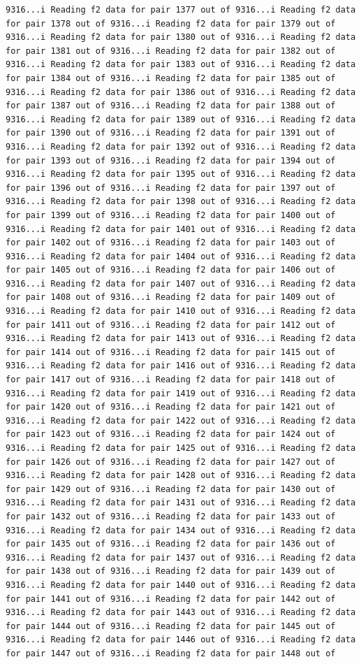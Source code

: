 \documentclass[
]{article}
\begin{document}
\begin{verbatim}
9316...i Reading f2 data for pair 1377 out of 9316...i Reading f2 data for pair 1378 out of 9316...i Reading f2 data for pair 1379 out of 9316...i Reading f2 data for pair 1380 out of 9316...i Reading f2 data for pair 1381 out of 9316...i Reading f2 data for pair 1382 out of 9316...i Reading f2 data for pair 1383 out of 9316...i Reading f2 data for pair 1384 out of 9316...i Reading f2 data for pair 1385 out of 9316...i Reading f2 data for pair 1386 out of 9316...i Reading f2 data for pair 1387 out of 9316...i Reading f2 data for pair 1388 out of 9316...i Reading f2 data for pair 1389 out of 9316...i Reading f2 data for pair 1390 out of 9316...i Reading f2 data for pair 1391 out of 9316...i Reading f2 data for pair 1392 out of 9316...i Reading f2 data for pair 1393 out of 9316...i Reading f2 data for pair 1394 out of 9316...i Reading f2 data for pair 1395 out of 9316...i Reading f2 data for pair 1396 out of 9316...i Reading f2 data for pair 1397 out of 9316...i Reading f2 data for pair 1398 out of 9316...i Reading f2 data for pair 1399 out of 9316...i Reading f2 data for pair 1400 out of 9316...i Reading f2 data for pair 1401 out of 9316...i Reading f2 data for pair 1402 out of 9316...i Reading f2 data for pair 1403 out of 9316...i Reading f2 data for pair 1404 out of 9316...i Reading f2 data for pair 1405 out of 9316...i Reading f2 data for pair 1406 out of 9316...i Reading f2 data for pair 1407 out of 9316...i Reading f2 data for pair 1408 out of 9316...i Reading f2 data for pair 1409 out of 9316...i Reading f2 data for pair 1410 out of 9316...i Reading f2 data for pair 1411 out of 9316...i Reading f2 data for pair 1412 out of 9316...i Reading f2 data for pair 1413 out of 9316...i Reading f2 data for pair 1414 out of 9316...i Reading f2 data for pair 1415 out of 9316...i Reading f2 data for pair 1416 out of 9316...i Reading f2 data for pair 1417 out of 9316...i Reading f2 data for pair 1418 out of 9316...i Reading f2 data for pair 1419 out of 9316...i Reading f2 data for pair 1420 out of 9316...i Reading f2 data for pair 1421 out of 9316...i Reading f2 data for pair 1422 out of 9316...i Reading f2 data for pair 1423 out of 9316...i Reading f2 data for pair 1424 out of 9316...i Reading f2 data for pair 1425 out of 9316...i Reading f2 data for pair 1426 out of 9316...i Reading f2 data for pair 1427 out of 9316...i Reading f2 data for pair 1428 out of 9316...i Reading f2 data for pair 1429 out of 9316...i Reading f2 data for pair 1430 out of 9316...i Reading f2 data for pair 1431 out of 9316...i Reading f2 data for pair 1432 out of 9316...i Reading f2 data for pair 1433 out of 9316...i Reading f2 data for pair 1434 out of 9316...i Reading f2 data for pair 1435 out of 9316...i Reading f2 data for pair 1436 out of 9316...i Reading f2 data for pair 1437 out of 9316...i Reading f2 data for pair 1438 out of 9316...i Reading f2 data for pair 1439 out of 9316...i Reading f2 data for pair 1440 out of 9316...i Reading f2 data for pair 1441 out of 9316...i Reading f2 data for pair 1442 out of 9316...i Reading f2 data for pair 1443 out of 9316...i Reading f2 data for pair 1444 out of 9316...i Reading f2 data for pair 1445 out of 9316...i Reading f2 data for pair 1446 out of 9316...i Reading f2 data for pair 1447 out of 9316...i Reading f2 data for pair 1448 out of 
\end{verbatim}
\end{document}
